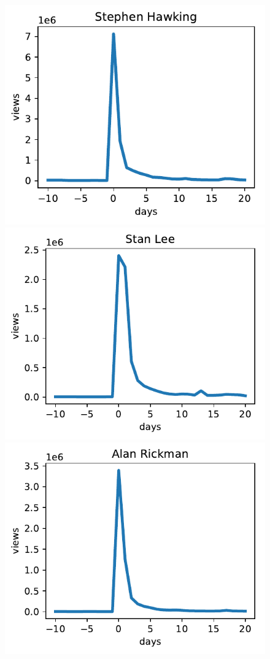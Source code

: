 \documentclass[conference]{IEEEtran}
\begin{document}
\begin{figure}[!htb]
  \includegraphics[width=\linewidth]{viewsSH.pdf}
\endminipage\hfill
{}
  \includegraphics[width=\linewidth]{viewsSL.pdf}
\endminipage\hfill
{}%
  \includegraphics[width=\linewidth]{viewsAR.pdf}

\end{figure}
\end{document}

